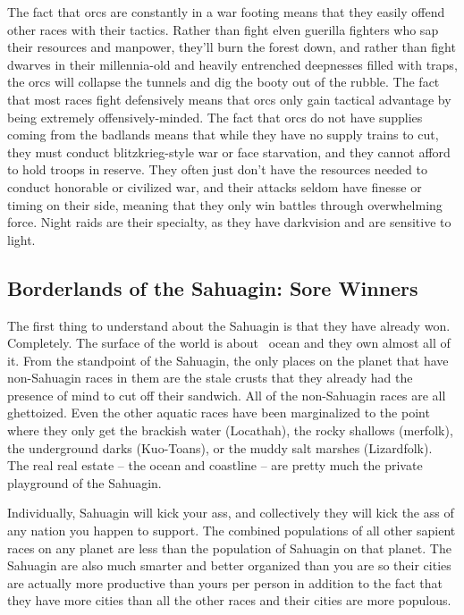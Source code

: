 The fact that orcs are constantly in a war footing means that they easily offend other races with their tactics. Rather than fight elven guerilla fighters who sap their resources and manpower, they'll burn the forest down, and rather than fight dwarves in their millennia-old and heavily entrenched deepnesses filled with traps, the orcs will collapse the tunnels and dig the booty out of the rubble. The fact that most races fight defensively means that orcs only gain tactical advantage by being extremely offensively-minded. The fact that orcs do not have supplies coming from the badlands means that while they have no supply trains to cut, they must conduct blitzkrieg-style war or face starvation, and they cannot afford to hold troops in reserve. They often just don't have the resources needed to conduct honorable or civilized war, and their attacks seldom have finesse or timing on their side, meaning that they only win battles through overwhelming force. Night raids are their specialty, as they have darkvision and are sensitive to light.

\subsection{Borderlands of the Sahuagin: Sore Winners}

The first thing to understand about the Sahuagin is that they have already won. Completely. The surface of the world is about \  ocean and they own almost all of it. From the standpoint of the Sahuagin, the only places on the planet that have non-Sahuagin races in them are the stale crusts that they already had the presence of mind to cut off their sandwich. All of the non-Sahuagin races are all ghettoized. Even the other aquatic races have been marginalized to the point where they only get the brackish water (Locathah), the rocky shallows (merfolk), the underground darks (Kuo-Toans), or the muddy salt marshes (Lizardfolk). The real real estate -- the ocean and coastline -- are pretty much the private playground of the Sahuagin.

Individually, Sahuagin will kick your ass, and collectively they will kick the ass of any nation you happen to support. The combined populations of all other sapient races on any planet are less than the population of Sahuagin on that planet. The Sahuagin are also much smarter and better organized than you are so their cities are actually more productive than yours per person in addition to the fact that they have more cities than all the other races and their cities are more populous.

